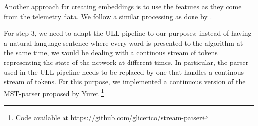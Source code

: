 Another approach for creating embeddings is to use the features as they come from the telemetry data.
We follow a similar processing as done by \cite{putina_telemetry-based_2018}.

For step 3, we need to adapt the ULL pipeline to our purposes: instead of having a natural language sentence where every word is presented to the algorithm at the same time, we would be dealing with a continous stream of tokens representing the state of the network at different times.
In particular, the parser used in the ULL pipeline needs to be replaced by one that handles a continous stream of tokens.
For this purpose, we implemented a continuous version of the MST-parser proposed by Yuret \cite{Yuret1999}\footnote{Code available at https://github.com/glicerico/stream-parser}
